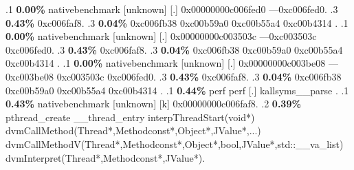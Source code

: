 \begin{profile}
{.1 \textbf{ 0.00\%} nativebenchmark  [unknown]              [.] 0x00000000c006fed0\newline {} ---0xc006fed0. 
.3 \textbf{0.43\%} 0xc006faf8. 
.3 \textbf{0.04\%} 0xc006fb38\newline {} 0xc00b59a0\newline {} 0xc00b55a4\newline {} 0xc00b4314\newline {} . 
.1 \textbf{ 0.00\%} nativebenchmark  [unknown]              [.] 0x00000000c003503c\newline {} ---0xc003503c\newline {} 0xc006fed0. 
.3 \textbf{0.43\%} 0xc006faf8. 
.3 \textbf{0.04\%} 0xc006fb38\newline {} 0xc00b59a0\newline {} 0xc00b55a4\newline {} 0xc00b4314\newline {} . 
.1 \textbf{ 0.00\%} nativebenchmark  [unknown]              [.] 0x00000000c003be08\newline {} ---0xc003be08\newline {} 0xc003503c\newline {} 0xc006fed0. 
.3 \textbf{0.43\%} 0xc006faf8. 
.3 \textbf{0.04\%} 0xc006fb38\newline {} 0xc00b59a0\newline {} 0xc00b55a4\newline {} 0xc00b4314\newline {} . 
.1 \textbf{ 0.44\%} perf             perf                   [.] kallsyms\_\_parse\newline {} . 
.1 \textbf{ 0.43\%} nativebenchmark  [unknown]              [k] 0x00000000c006faf8. 
.2 \textbf{0.39\%} pthread\_create\newline {} \_\_thread\_entry\newline {} interpThreadStart(void*)\newline {} dvmCallMethod(Thread*,Methodconst*,Object*,JValue*,...)\newline {} dvmCallMethodV(Thread*,Methodconst*,Object*,bool,JValue*,std::\_\_va\_list)\newline {} dvmInterpret(Thread*,Methodconst*,JValue*). 
}
\end{profile}
